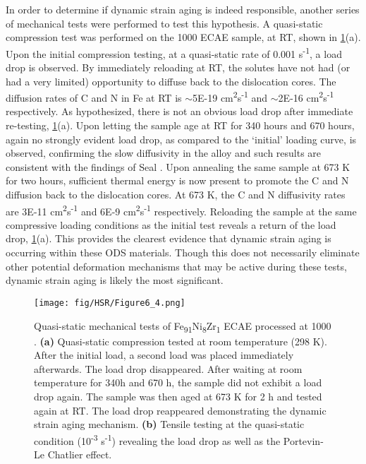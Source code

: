 		In order to determine if dynamic strain aging is indeed responsible, another series of mechanical tests were performed to test this hypothesis. A quasi-static compression test was performed on the 1000 \celsius{}   ECAE sample, at RT, shown in \ref{fig:HSR6}(a). Upon the initial compression testing, at a quasi-static rate of 0.001 s\textsuperscript{-1}, a load drop is observed. By immediately reloading at RT, the solutes have not had (or had a very limited) opportunity to diffuse back to the dislocation cores. The diffusion rates of C and N in Fe at RT is $\sim$5E-19 cm\textsuperscript{2}s\textsuperscript{-1} \cite{RN23} and $\sim$2E-16 cm\textsuperscript{2}s\textsuperscript{-1} \cite{RN3460} respectively. As hypothesized, there is not an obvious load drop after immediate re-testing, \ref{fig:HSR6}(a). Upon letting the sample age at RT for 340 hours and 670 hours, again no strongly evident load drop, as compared to the ‘initial’ loading curve, is observed, confirming the slow diffusivity in the alloy and such results are consistent with the findings of Seal \cite{RN719}. Upon annealing the same sample at 673 K for two hours, sufficient thermal energy is now present to promote the C and N diffusion back to the dislocation cores. At 673 K, the C and N diffusivity rates are 3E-11 cm\textsuperscript{2}s\textsuperscript{-1} \cite{RN23} and 6E-9 cm\textsuperscript{2}s\textsuperscript{-1} \cite{RN3460} respectively. Reloading the sample at the same compressive loading conditions as the initial test reveals a return of the load drop, \ref{fig:HSR6}(a). This provides the clearest evidence that dynamic strain aging is occurring within these ODS materials. Though this does not necessarily eliminate other potential deformation mechanisms that may be active during these tests, dynamic strain aging is likely the most significant. 
		
		\begin{figure}
			\centering
			\texttt{[image: fig/HSR/Figure6\_4.png]}
			\caption[Quasi-static mechanical tests of Fe\textsubscript{91}Ni\textsubscript{8}Zr\textsubscript{1 } ECAE processed at 1000 \celsius{}.]{Quasi-static mechanical tests of Fe\textsubscript{91}Ni\textsubscript{8}Zr\textsubscript{1 } ECAE processed at 1000 \celsius{}. \textbf{(a)} Quasi-static compression
				tested at room temperature (298 K). After the initial load, a second load was
				placed immediately afterwards. The load drop disappeared. After waiting at
				room temperature for 340h and 670 h, the sample did not exhibit a load drop
				again. The sample was then aged at 673 K for 2 h and tested again at RT. The
				load drop reappeared demonstrating the dynamic strain aging mechanism. \textbf{(b)}
				Tensile testing at the quasi-static condition (10\textsuperscript{-3} s\textsuperscript{-1}) revealing the load drop
				as well as the Portevin-Le Chatlier effect.}
			\label{fig:HSR6}
		\end{figure} 
		
